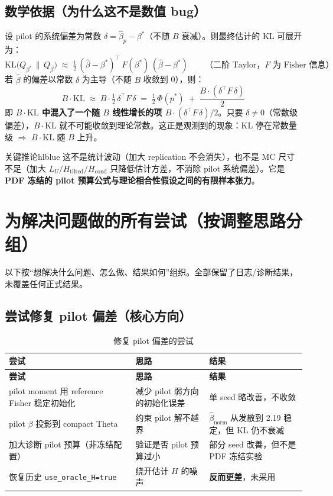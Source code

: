 \documentclass[11pt,a4paper]{ctexart}
\newcommand{\hcell}[1]{\textcolor{hlblue!85!black}{\bfseries #1}}
\begin{document}
\subsection{数学依据（为什么这不是数值 bug）}
设 pilot 的系统偏差为常数 $\delta=\hat\beta_p-\beta^*$（不随 $B$ 衰减）。则最终估计的 KL 可展开为：
\[
  \mathrm{KL}\big( Q_{\beta^*}\,\lVert\, Q_{\hat\beta} \big)
  \;\approx\; \tfrac12\,(\hat\beta-\beta^*)^\top\, F(\beta^*)\,(\hat\beta-\beta^*)
  \qquad\text{（二阶 Taylor，$F$ 为 Fisher 信息）}
\]
若 $\hat\beta$ 的偏差以常数 $\delta$ 为主导（不随 $B$ 收敛到 0），则：
\[
  B\cdot\mathrm{KL}
  \;\approx\; B\cdot\tfrac12\,\delta^\top F\,\delta
  \;=\; \tfrac12\,\Phi(p^*) \;+\; \frac{B\cdot(\delta^\top F\,\delta)}{2}
\]
即 \textbf{$B\cdot\mathrm{KL}$ 中混入了一个随 $B$ 线性增长的项 $B\cdot(\delta^\top F\,\delta)/2$}。只要 $\delta\neq 0$（常数级偏差），$B\cdot\mathrm{KL}$ 就不可能收敛到理论常数。这正是观测到的现象：KL 停在常数量级 $\Rightarrow$ $B\cdot\mathrm{KL}$ 随 $B$ 上升。

\begin{keybox}{关键推论}{hlblue}
这不是统计波动（加大 replication 不会消失），也不是 MC 尺寸不足（加大 $L_U/H_{\text{tilted}}/H_{\text{cond}}$ 只降低估计方差，不消除 pilot 系统偏差）。它是 \textbf{PDF 冻结的 pilot 预算公式与理论相合性假设之间的有限样本张力}。
\end{keybox}

\section{为解决问题做的所有尝试（按调整思路分组）}
以下按“想解决什么问题、怎么做、结果如何”组织。全部保留了日志/诊断结果，未覆盖任何正式结果。

\subsection{尝试修复 pilot 偏差（核心方向）}
\begin{longtable}{@{}L{4.2cm}L{4.6cm}L{6.2cm}@{}}
  \caption{修复 pilot 偏差的尝试}\label{tbl:pilot}\\
  \toprule[1.4pt]
  \hcell{尝试} & \hcell{思路} & \hcell{结果} \\
  \midrule[0.8pt]
  \endfirsthead
  \toprule[1.4pt]
  \hcell{尝试} & \hcell{思路} & \hcell{结果} \\
  \midrule[0.8pt]
  \endhead
  \bottomrule[1.4pt]
  \endfoot
  pilot moment 用 reference Fisher 稳定初始化 & 减少 pilot 弱方向的初始化误差 & 单 seed 略改善，不收敛 \\
  pilot $\beta$ 投影到 compact Theta & 约束 pilot 解不越界 & $\hat\beta_{\text{norm}}$ 从发散到 2.19 稳定，但 KL 仍不衰减 \\
  加大诊断 pilot 预算（非冻结配置） & 验证是否 pilot 预算过小 & 部分 seed 改善，但不是 PDF 冻结实验 \\
  恢复历史 \texttt{use\_oracle\_H=true} & 绕开估计 $H$ 的噪声 & \textbf{反而更差}，未采用 \\
  \bottomrule[1.4pt]
\end{longtable}
\end{document}
